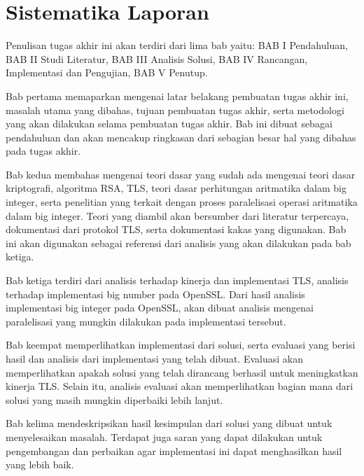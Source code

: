 \section{Sistematika Laporan}
Penulisan tugas akhir ini akan terdiri dari lima bab yaitu: BAB I Pendahuluan, BAB II Studi Literatur, BAB III Analisis Solusi, BAB IV Rancangan, Implementasi dan Pengujian, BAB V Penutup.

Bab pertama memaparkan mengenai latar belakang pembuatan tugas akhir ini, masalah utama yang dibahas, tujuan pembuatan tugas akhir, serta metodologi yang akan dilakukan selama pembuatan tugas akhir. Bab ini dibuat sebagai pendahuluan dan akan mencakup ringkasan dari sebagian besar hal yang dibahas pada tugas akhir.

Bab kedua membahas mengenai teori dasar yang sudah ada mengenai teori dasar kriptografi, algoritma RSA, TLS, teori dasar perhitungan aritmatika dalam big integer, serta penelitian yang terkait dengan proses paralelisasi operasi aritmatika dalam big integer. Teori yang diambil akan bersumber dari literatur terpercaya, dokumentasi dari protokol TLS, serta dokumentasi kakas yang digunakan. Bab ini akan digunakan sebagai referensi dari analisis yang akan dilakukan pada bab ketiga.

Bab ketiga terdiri dari analisis terhadap kinerja dan implementasi TLS, analisis terhadap implementasi big number pada OpenSSL. Dari hasil analisis implementasi big integer pada OpenSSL, akan dibuat analisis mengenai paralelisasi yang mungkin dilakukan pada implementasi tersebut.

Bab keempat memperlihatkan implementasi dari solusi, serta evaluasi yang berisi hasil dan analisis dari implementasi yang telah dibuat. Evaluasi akan memperlihatkan apakah solusi yang telah dirancang berhasil untuk meningkatkan kinerja TLS. Selain itu, analisis evaluasi akan memperlihatkan bagian mana dari solusi yang masih mungkin diperbaiki lebih lanjut.

Bab kelima mendeskripsikan hasil kesimpulan dari solusi yang dibuat untuk menyelesaikan masalah. Terdapat juga saran yang dapat dilakukan untuk pengembangan dan perbaikan agar implementasi ini dapat menghasilkan hasil yang lebih baik.
